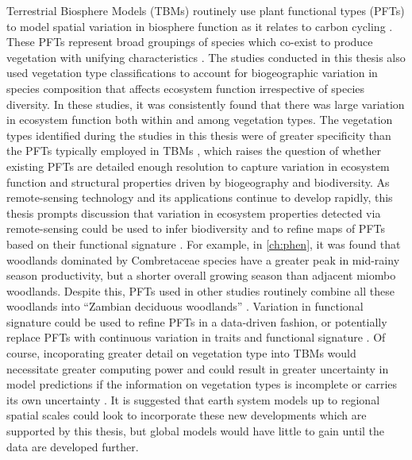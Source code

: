 \begin{refsection}
Terrestrial Biosphere Models (TBMs) routinely use plant functional types (PFTs) to model spatial variation in biosphere function as it relates to carbon cycling \citep{Fisher2014}. These PFTs represent broad groupings of species which co-exist to produce vegetation with unifying characteristics \citep{Bonan2002}. The studies conducted in this thesis also used vegetation type classifications to account for biogeographic variation in species composition that affects ecosystem function irrespective of species diversity. In these studies, it was consistently found that there was large variation in ecosystem function both within and among vegetation types. The vegetation types identified during the studies in this thesis were of greater specificity than the PFTs typically employed in TBMs \citep{}, which raises the question of whether existing PFTs are detailed enough resolution to capture variation in ecosystem function and structural properties driven by biogeography and biodiversity. As remote-sensing technology and its applications continue to develop rapidly, this thesis prompts discussion that variation in ecosystem properties detected via remote-sensing could be used to infer biodiversity and to refine maps of PFTs based on their functional signature \citep{}. For example, in \autoref{ch:phen}, it was found that woodlands dominated by Combretaceae species have a greater peak in mid-rainy season productivity, but a shorter overall growing season than adjacent miombo woodlands. Despite this, PFTs used in other studies routinely combine all these woodlands into ``Zambian deciduous woodlands'' \citep{}. Variation in functional signature could be used to refine PFTs in a data-driven fashion, or potentially replace PFTs with continuous variation in traits and functional signature \citep{Ustin2010}. Of course, incoporating greater detail on vegetation type into TBMs would necessitate greater computing power and could result in greater uncertainty in model predictions if the information on vegetation types is incomplete or carries its own uncertainty \citep{}. It is suggested that earth system models up to regional spatial scales could look to incorporate these new developments which are supported by this thesis, but global models would have little to gain until the data are developed further.


\end{refsection}
